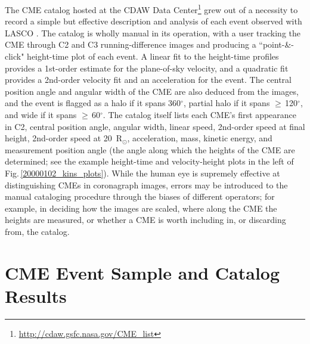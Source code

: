 \documentclass[referee,a4paper,12pt,traditabstract]{swsc}
\begin{document}
\begin{linenumbers}
The CME catalog hosted at the CDAW Data Center\footnote{\href{http://cdaw.gsfc.nasa.gov/CME_list}{http://cdaw.gsfc.nasa.gov/CME\_list}}  grew out of a necessity to record a simple but effective description and analysis of each event observed with LASCO \citep{2009EM&P..104..295G}. The catalog is wholly manual in its operation, with a user tracking the CME through C2 and C3 running-difference images and producing a ``point-\&-click" height-time plot of each event. A linear fit to the height-time profiles provides a 1st-order estimate for the plane-of-sky velocity, and a quadratic fit provides a 2nd-order velocity fit and an acceleration for the event. The central position angle and angular width of the CME are also deduced from the images, and the event is flagged as a halo if it spans 360$^{\circ}$, partial halo if it spans $\ge$\,120$^{\circ}$, and wide if it spans $\ge$\,60$^{\circ}$. The catalog itself lists each CME's first appearance in C2, central position angle, angular width, linear speed, 2nd-order speed at final height, 2nd-order speed at 20~R$_{\odot}$, acceleration, mass, kinetic energy, and measurement position angle (the angle along which the heights of the CME are determined; see the example height-time and velocity-height plots in the left of Fig.\,\ref{20000102_kins_plots}). While the human eye is supremely effective at distinguishing CMEs in coronagraph images, errors may be introduced to the manual cataloging procedure through the biases of different operators; for example, in deciding how the images are scaled, where along the CME the heights are measured, or whether a CME is worth including in, or discarding from, the catalog.


\section{CME Event Sample and Catalog Results}
\label{sect_events}


\end{linenumbers}
\end{document}
